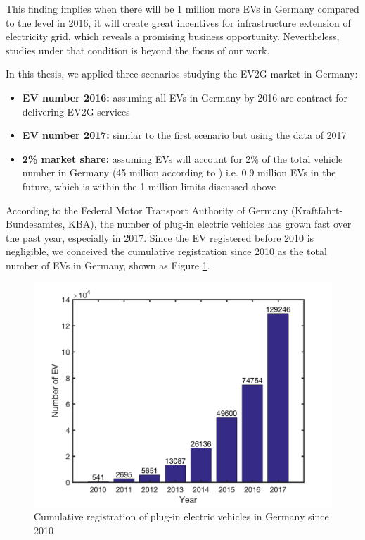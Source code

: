 This finding implies when there will be 1 million more EVs in Germany compared to the level in 2016, it will create great incentives for infrastructure extension of electricity grid, which reveals a promising business opportunity. Nevertheless, studies under that condition is beyond the focus of our work.

In this thesis, we applied three scenarios studying the EV2G market in Germany:

\begin{itemize}
	\item \textbf{EV number 2016:} assuming all  EVs in Germany by 2016 are contract for delivering EV2G services
	\item \textbf{EV number 2017:} similar to the first scenario but using the data of 2017
	\item \textbf{2\% market share:} assuming EVs will account for 2\% of the total vehicle number in Germany (45 million according to \cite{Eurostat_de_v}) i.e. 0.9 million EVs in the future, which is within the 1 million limits discussed above
\end{itemize}

According to the Federal Motor Transport Authority of Germany (Kraftfahrt-Bundesamtes, KBA)\cite{KBA2017}, the number of plug-in electric vehicles has grown fast over the past year, especially in 2017. Since the EV registered before 2010 is negligible, we conceived the cumulative registration since 2010 as the total number of EVs in Germany, shown as Figure \ref{fig:Germany_EV_number}.

\begin{figure}[h!]
	\centering
	\includegraphics[width=0.95\linewidth]{Figures/Germany_EV_number}
	\caption{Cumulative registration of plug-in electric vehicles in Germany since 2010 \cite{KBA2017}}
	\label{fig:Germany_EV_number}
\end{figure}

